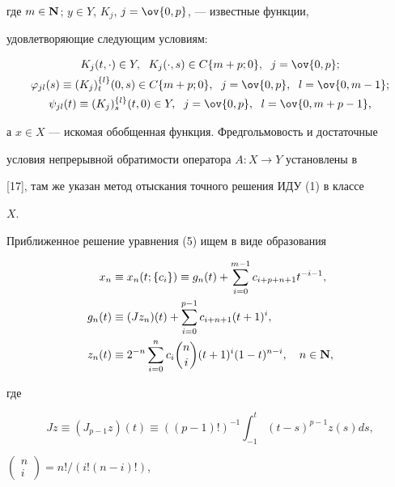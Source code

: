 где $m\in\bold N$; $y\in Y$, $K_j$, $j=\ov{0,p}$, --- известные функции, 


удовлетворяющие следующим условиям: 


\begin{gather} 


K_j(t,\cdot)\in Y,\ \; K_j(\cdot,s)\in C\{m+p;0\},\ 


\;j=\ov{0,p};\notag\\ 


\varphi_{j l}(s)\equiv(K_j)^{\{l\}}_t(0,s)\in C\{m+p;0\}, 


\ \; j=\ov{0,p},\ \; l=\ov{0,m-1}; \\ 


\psi_{j l}(t)\equiv(K_j)^{\{l\}}_s(t,0)\in Y, 


\ \; j=\ov{0,p},\ \; l=\ov{0,m+p-1},\notag 


\end{gather} 


а $x\in X$ --- искомая обобщенная функция. Фредгольмовость и достаточные 


условия непрерывной обратимости оператора $A:X\to Y$ установлены в 


[17], там же указан метод отыскания точного решения ИДУ (1) в классе 


$X$. 


 


Приближенное решение уравнения (5) ищем в виде образования 


\begin{align} 


x_n&\equiv x_n(t;\{c_i\})\equiv g_n(t)+\sum^{m-1}_{i=0} 


c_{i+p+n+1}t^{-i-1},\\ 


g_n(t)&\equiv (J z_n)(t)+\sum^{p-1}_{i=0}c_{i+n+1}(t+1)^i,\\ 


z_n(t)&\equiv 2^{-n}\sum^n_{i=0}c_i\binom{n}{i}(t+1)^i(1-t)^{n-i}, 


\quad n\in\bold N, 


\end{align} 


где 


$$ 


J z\equiv(J_{p-1}z)(t)\equiv((p-1)!)^{-1}\int^t_{-1} 


(t-s)^{p-1}z(s)d s, 


$$ 


$\left(\begin{smallmatrix}n\\i\end{smallmatrix}\right)= n!/(i!(n-i)!)$, 


